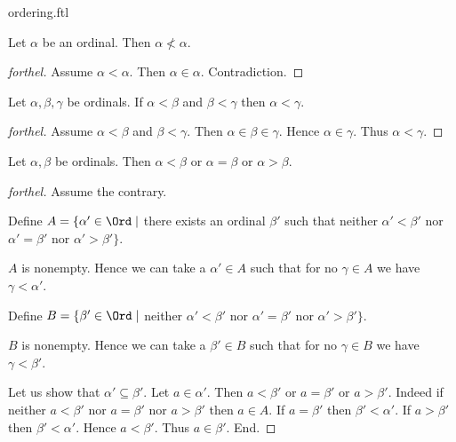 \documentclass{naproche-library}
\begin{document}
\begin{smodule}{ordering.ftl}
  \begin{proposition}[forthel,id=SET_THEORY_02_6229364135952384,printid]
    Let $\alpha$ be an ordinal.
    Then $\alpha \nless \alpha$.
  \end{proposition}
  \begin{proof}[forthel]
    Assume $\alpha < \alpha$.
    Then $\alpha \in \alpha$.
    Contradiction.
  \end{proof}

  \begin{proposition}[forthel,id=SET_THEORY_02_7098683017396224,printid]
    Let $\alpha, \beta, \gamma$ be ordinals.
    If $\alpha < \beta$ and $\beta < \gamma$ then $\alpha < \gamma$.
  \end{proposition}
  \begin{proof}[forthel]
    Assume $\alpha < \beta$ and $\beta < \gamma$.
    Then $\alpha \in \beta \in \gamma$.
    Hence $\alpha \in \gamma$.
    Thus $\alpha < \gamma$.
  \end{proof}

  \begin{proposition}[forthel,id=SET_THEORY_02_1718825707896832,printid]
    Let $\alpha, \beta$ be ordinals.
    Then $\alpha < \beta$ or $\alpha = \beta$ or $\alpha > \beta$.
  \end{proposition}
  \begin{proof}[forthel]
    Assume the contrary.
    
    Define $A = \{ \alpha' \in \Ord \mid$ there exists an ordinal $\beta'$ such that neither $\alpha' < \beta'$ nor $\alpha' = \beta'$ nor $\alpha' > \beta' \}$.
    
    $A$ is nonempty.
    Hence we can take a $\alpha' \in A$ such that for no $\gamma \in A$ we have $\gamma < \alpha'$.
    
    Define $B = \{ \beta' \in \Ord \mid$ neither $\alpha' < \beta'$ nor $\alpha' = \beta'$ nor $\alpha' > \beta' \}$.
    
    $B$ is nonempty.
    Hence we can take a $\beta' \in B$ such that for no $\gamma \in B$ we have $\gamma < \beta'$.

    Let us show that $\alpha' \subseteq \beta'$.
      Let $a \in \alpha'$.
      Then $a < \beta'$ or $a = \beta'$ or $a > \beta'$.
      Indeed if neither $a < \beta'$ nor $a = \beta'$ nor $a > \beta'$ then
      $a \in A$.
      If $a = \beta'$ then $\beta' < \alpha'$.
      If $a > \beta'$ then $\beta' < \alpha'$.
      Hence $a < \beta'$.
      Thus $a \in \beta'$.
    End.


\end{proof}
\end{smodule}
\end{document}
